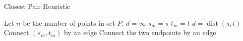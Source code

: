\begin{algorithm}
\caption{Closest Pair Heuristic}
\begin{algorithmic}
\STATE Let $n$ be the number of points in set $P$.
  \STATE $d=\infty$
      \STATE $s_m=s$
      \STATE $t_m=t$
      \STATE $d=\operatorname{dist}(s,t)$
    \ENDIF
  \ENDFOR
  \STATE Connect $(s_m,t_m)$ by an edge
\ENDFOR
\STATE Connect the two endpoints by an edge
\ENDPROCEDURE
\end{algorithmic}
\end{algorithm}